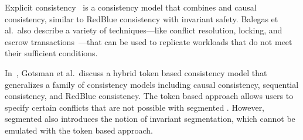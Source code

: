 Explicit consistency~\cite{balegas2015towards} is a consistency model that
combines \invariantconfluence{} and causal consistency, similar to RedBlue
consistency with invariant safety.
%
Balegas et al.\ also describe a variety of techniques---like conflict
resolution, locking, and escrow transactions~\cite{o1986escrow}---that can be
used to replicate workloads that do not meet their sufficient conditions.

In~\cite{gotsman2016cause}, Gotsman et al.\ discuss a hybrid token based
consistency model that generalizes a family of consistency models including
causal consistency, sequential consistency, and RedBlue consistency.
The token based approach allows users to
specify certain conflicts that are not possible with segmented
\invariantconfluence{}.
However, segmented
\invariantconfluence{} also introduces the notion of invariant segmentation,
which cannot be emulated with the token based approach.



